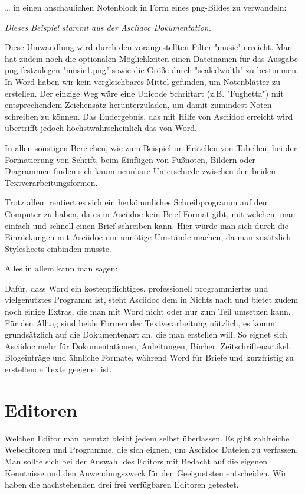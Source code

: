 \documentclass[11pt]{amsbook}
\begin{document}
\emph{…​} in einen anschaulichen Notenblock in Form eines png-Bildes zu verwandeln:





\emph{Dieses Beispiel stammt aus der Asciidoc Dokumentation.}


Diese Umwandlung wird durch den vorangestellten Filter "music" erreicht. Man hat zudem noch die optionalen Möglichkeiten einen Dateinamen für das Ausgabe-png festzulegen "music1.png" sowie die Größe durch "scaledwidth" zu bestimmen. In Word haben wir kein vergleichbares Mittel gefunden, um Notenblätter zu erstellen. Der einzige Weg wäre eine Unicode Schriftart (z.B. "Fughetta") mit entsprechendem Zeichensatz herunterzuladen, um damit zumindest Noten schreiben zu können. Das Endergebnis, das mit Hilfe von Asciidoc erreicht wird übertrifft jedoch höchstwahrscheinlich das von Word.


In allen sonstigen Bereichen, wie zum Beispiel im Erstellen von Tabellen, bei der Formatierung von Schrift, beim Einfügen von Fußnoten, Bildern oder Diagrammen finden sich kaum nennbare Unterschiede zwischen den beiden Textverarbeitungsformen.


Trotz allem rentiert es sich ein herkömmliches Schreibprogramm auf dem Computer zu haben, da es in Asciidoc kein Brief-Format gibt, mit welchem man einfach und schnell einen Brief schreiben kann. Hier würde man sich durch die Einrückungen mit Asciidoc nur unnötige Umstände machen, da man zusätzlich Stylesheets einbinden müsste.


Alles in allem kann man sagen:


Dafür, dass Word ein kostenpflichtiges, professionell programmiertes und vielgenutztes Programm ist, steht Asciidoc dem in Nichts nach und bietet zudem noch einige Extras, die man mit Word nicht oder nur zum Teil umsetzen kann. Für den Alltag sind beide Formen der Textverarbeitung nützlich, es kommt grundsätzlich auf die Dokumentenart an, die man erstellen will. So eignet sich Asciidoc mehr für Dokumentationen, Anleitungen, Bücher, Zeitschriftenartikel, Blogeinträge und ähnliche Formate, während Word für Briefe und kurzfristig zu erstellende Texte geeignet ist.


\hypertarget{x-editoren}{\chapter*{Editoren}}
Welchen Editor man benutzt bleibt jedem selbst überlassen. Es gibt zahlreiche Webeditoren und Programme, die sich eignen, um Asciidoc Dateien zu verfassen. Man sollte sich bei der Auswahl des Editors mit Bedacht auf die eigenen Kenntnisse und den Anwendungszweck für den Geeignetsten entscheiden. Wir haben die nachstehenden drei frei verfügbaren Editoren getestet.
\end{document}
